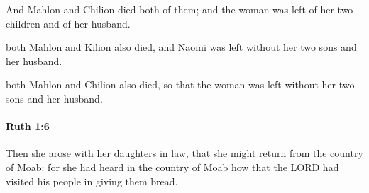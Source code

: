 			\begin{versebox}
					\item[BHS] 
					\item[LXX] 
					\item[ASV] And Mahlon and Chilion died both of them; and the woman was left of her two children and of her husband.
					\item[NIV] both Mahlon and Kilion also died, and Naomi was left without her two sons and her husband.
					\item[NRSV] both Mahlon and Chilion also died, so that the woman was left without her two sons and her husband.
			\end{versebox}

		\paragraph{Ruth 1:6} %
			\label{RUTH-1-6}

			Then she arose with her daughters in law, that she might return from the country of Moab: for she had heard in the country of Moab how that the LORD had visited his people in giving them bread.

